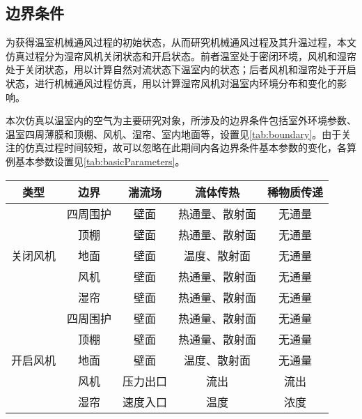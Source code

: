 	\subsection{边界条件}
	为获得温室机械通风过程的初始状态，从而研究机械通风过程及其升温过程，本文仿真过程分为湿帘风机关闭状态和开启状态。前者温室处于密闭环境，风机和湿帘处于关闭状态，用以计算自然对流状态下温室内的状态；后者风机和湿帘处于开启状态，进行机械通风过程仿真，用以计算湿帘风机对温室内环境分布和变化的影响。
	
本次仿真以温室内的空气为主要研究对象，所涉及的边界条件包括室外环境参数、温室四周薄膜和顶棚、风机、湿帘、室内地面等，设置见\ref{tab:boundary}。由于关注的仿真过程时间较短，故可以忽略在此期间内各边界条件基本参数的变化，各算例基本参数设置见\ref{tab:basicParameters}。
		\begin{table}[!hpb]
  			\centering
  			\begin{tabular}{ccccc} \toprule
			类型	 & 边界 & 湍流场 & 	流体传热 & 	稀物质传递\\ \midrule
			\multirow{5}{*}{关闭风机} & 四周围护 & 壁面 & 热通量、散射面 & 无通量\\ 
												  & 顶棚  & 壁面 & 热通量、散射面 & 无通量\\
												  & 地面 & 壁面 & 温度、散射面 & 无通量\\
												  & 风机 & 壁面 & 热通量、散射面 & 无通量\\
												  & 湿帘 & 壁面 & 热通量、散射面 & 无通量\\ \midrule
			\multirow{5}{*}{开启风机} & 四周围护 & 壁面 & 热通量、散射面 & 无通量\\
												  & 顶棚 & 壁面	 & 热通量、散射面	 & 无通量\\
												  & 地面 &  壁面 & 温度、散射面	 & 无通量\\
												  & 风机 &  压力出口 & 	流出 & 	流出\\
												  & 湿帘 & 速度入口	 & 温度 & 浓度\\ \bottomrule
 			\end{tabular}
		\end{table}	

